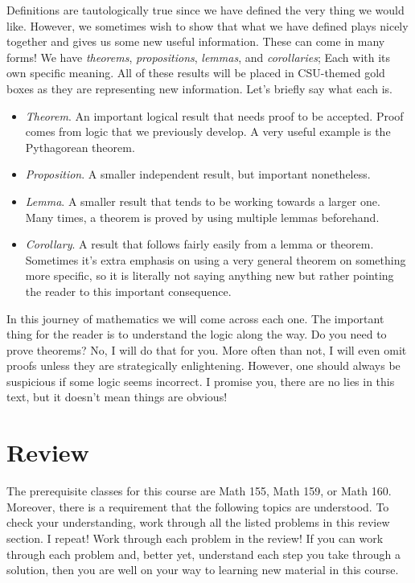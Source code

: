     Definitions are tautologically true since we have defined the very thing we would like.  However, we sometimes wish to show that what we have defined plays nicely together and gives us some new useful information.  These can come in many forms!  We have \emph{theorems}, \emph{propositions}, \emph{lemmas}, and \emph{corollaries}; Each with its own specific meaning.  All of these results will be placed in CSU-themed gold boxes as they are representing new information. Let's briefly say what each is.

    \begin{itemize}
        \item \emph{Theorem}. An important logical result that needs proof to be accepted.  Proof comes from logic that we previously develop.  A very useful example is the Pythagorean theorem.
        \item \emph{Proposition}. A smaller independent result, but important nonetheless.
        \item \emph{Lemma}. A smaller result that tends to be working towards a larger one.  Many times, a theorem is proved by using multiple lemmas beforehand.
        \item \emph{Corollary}. A result that follows fairly easily from a lemma or theorem.  Sometimes it's extra emphasis on using a very general theorem on something more specific, so it is literally not saying anything new but rather pointing the reader to this important consequence.
    \end{itemize}

    In this journey of mathematics we will come across each one.  The important thing for the reader is to understand the logic along the way.  Do you need to prove theorems? No, I will do that for you. More often than not, I will even omit proofs unless they are strategically enlightening.  However, one should always be suspicious if some logic seems incorrect. I promise you, there are no lies in this text, but it doesn't mean things are obvious!


    \section{Review}
    The prerequisite classes for this course are Math 155, Math 159, or Math 160.  Moreover, there is a requirement that the following topics are understood.  To check your understanding, work through all the listed problems in this review section. I repeat! Work through each problem in the review! If you can work through each problem and, better yet, understand each step you take through a solution, then you are well on your way to learning new material in this course.

